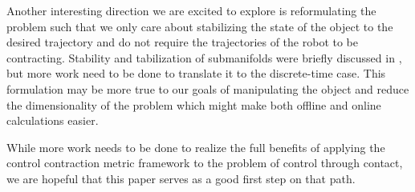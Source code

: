 \documentclass[journal]{IEEEtran}
\begin{document}
Another interesting direction we are excited to explore is reformulating the problem such that we only care about stabilizing the state of the object to the desired trajectory and do not require the trajectories of the robot to be contracting. Stability and tabilization of submanifolds were briefly discussed in \autocite{manchesterControlContractionMetrics2017}, but more work need to be done to translate it to the discrete-time case. This formulation may be more true to our goals of manipulating the object and reduce the dimensionality of the problem which might make both offline and online calculations easier.

While more work needs to be done to realize the full benefits of applying the control contraction metric framework to the problem of control through contact, we are hopeful that this paper serves as a good first step on that path.

\printbibliography
\end{document}
